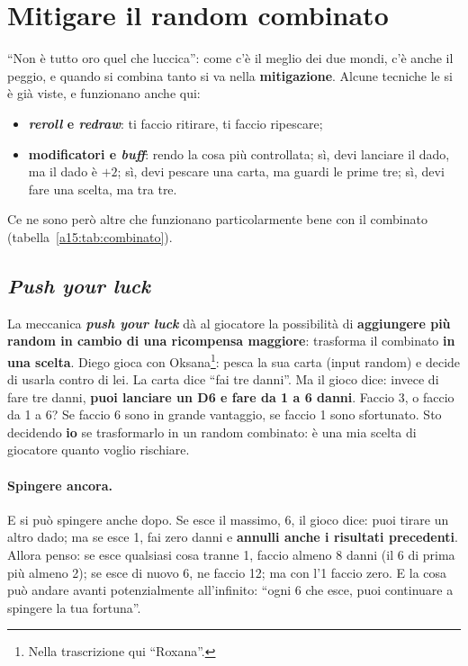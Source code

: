 \section{Mitigare il random combinato}
\label{a15:sec:mitigazionecomb}

``Non è tutto oro quel che luccica'': come c'è il meglio dei due mondi, c'è anche il peggio,
e quando si combina tanto si va nella \textbf{mitigazione}. Alcune tecniche le si è già viste,
e funzionano anche qui:
\begin{itemize}
  \item \textbf{\emph{reroll} e \emph{redraw}}: ti faccio ritirare, ti faccio ripescare;
  \item \textbf{modificatori e \emph{buff}}: rendo la cosa più controllata; sì, devi lanciare
        il dado, ma il dado è $+2$; sì, devi pescare una carta, ma guardi le prime tre; sì,
        devi fare una scelta, ma tra tre.
\end{itemize}
Ce ne sono però altre che funzionano particolarmente bene con il combinato
(tabella~\ref{a15:tab:combinato}).

\subsection{\emph{Push your luck}}

La meccanica \textbf{\emph{push your luck}} dà al giocatore la possibilità di
\textbf{aggiungere più random in cambio di una ricompensa maggiore}: trasforma il combinato
\textbf{in una scelta}. Diego gioca con Oksana\footnote{Nella trascrizione qui ``Roxana''.}:
pesca la sua carta (input random) e decide di usarla contro di lei. La carta dice ``fai tre
danni''. Ma il gioco dice: invece di fare tre danni, \textbf{puoi lanciare un D6 e fare da 1 a
6 danni}. Faccio 3, o faccio da 1 a 6? Se faccio 6 sono in grande vantaggio, se faccio 1 sono
sfortunato. Sto decidendo \textbf{io} se trasformarlo in un random combinato: è una mia scelta
di giocatore quanto voglio rischiare.

\paragraph{Spingere ancora.} E si può spingere anche dopo. Se esce il massimo, 6, il gioco
dice: puoi tirare un altro dado; ma se esce 1, fai zero danni e \textbf{annulli anche i
risultati precedenti}. Allora penso: se esce qualsiasi cosa tranne 1, faccio almeno 8 danni (il
6 di prima più almeno 2); se esce di nuovo 6, ne faccio 12; ma con l'1 faccio zero. E la cosa
può andare avanti potenzialmente all'infinito: ``ogni 6 che esce, puoi continuare a spingere
la tua fortuna''.

